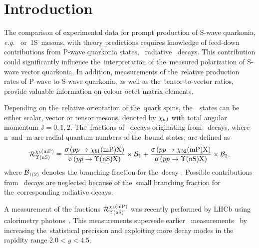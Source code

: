 \section{Introduction}
\label{sec:introduction}

The comparison of experimental data for prompt production of \mbox{S-wave} quarkonia,
{\it{e.g.}}  \jpsi~or~\Y1S~mesons, with theory predictions requires
knowledge of feed-down contributions from P-wave quarkonia
states, \eg~radiative \decay{\chib}{\ups\g}~decays.
This contribution could significantly influence
the~interpretation of the~measured polarization of S-wave vector
quarkonia. In addition, measurements of the~relative production rates of P-wave to S-wave
quarkonia, as well as the~tensor-to-vector ratios, provide valuable
information on colour-octet matrix elements.


Depending on the~relative orientation of the~quark spins,
the~\chib~states can be either scalar, vector or tensor mesons, denoted by
$\chi_{{b} \mathrm{J}}$ with total angular momentum $\mathrm{J}=0,1,2$.
The~fractions of \YnS~decays
originating from \chibmp~decays,
where $\mathrm{n}$~and~$\mathrm{m}$ are radial quantum numbers of
the~bound states, are defined as
\begin{equation}
  \mathcal{R}^{\chi_{{b}}\mathrm{(mP)}}_{\Upsilon\mathrm{(nS)}} \equiv
  \dfrac
      {\upsigma  \left( {p}{p} \rightarrow \chi_{{b}1}\mathrm{(mP)} \mathrm{X} \right)}
      {\upsigma  \left( {p}{p} \rightarrow \Upsilon\mathrm{(nS)}    \mathrm{X} \right)}
      \times {\ensuremath{\cal B}}_1
      + \dfrac
      {\upsigma  \left( {p}{p} \rightarrow \chi_{{b}2}\mathrm{(mP)} \mathrm{X} \right)}
      {\upsigma  \left( {p}{p} \rightarrow \Upsilon\mathrm{(nS)}    \mathrm{X} \right)}
      \times {\ensuremath{\cal B}}_2
      \label{eq:r},
\end{equation}
where ${\cal B}_{1(2)}$ denotes the branching fraction 
for the~decay .
Possible contributions from ~decays 
are neglected because  of the~small branching fraction for the~corresponding
radiative decays.

A measurement of the fractions $\mathcal{R}^{\chi_{{b}}\mathrm{(mP)}}_{\Upsilon\mathrm{(nS)}}$ was
recently performed by LHCb using calorimetry photons~\cite{Aaij:1746553}.
This measurements supersede earlier \lhcb~measurements~\cite{LHCb-PAPER-2012-015,LHCb-CONF-2012-020}
by increasing the~statistical precision and exploiting more decay modes 
in the rapidity range  $2.0<y<4.5$.
